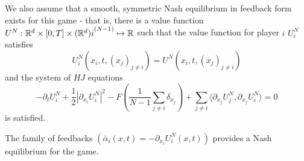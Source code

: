 We also assume that a smooth, symmetric Nash equilibrium in feedback form exists for
this game - that is, there is a value function
$U^N : \mathbb{R}^d \times [0,T] \times {(\mathbb{R}^d)i}^{(N-1)} \mapsto \mathbb{R}$ such that
the value function for player $i$ $U^N_i$ satisfies
\begin{equation}
    U^N_i(x_i, t, {(x_j)}_{j\neq i}) = U^N(x_i, t, {(x_j)}_{j\neq i})
\end{equation}
and the system of $HJ$ equations
\begin{equation}
    -\partial_t U_i^N + \frac{1}{2}|\partial_{x_i} U_i^N|^2 - F\left( \frac{1}{N-1}  \sum_{j\neq i} \delta_{x_j} \right) + \sum_{j \neq i} \langle \partial_{x_j} U^N_j, \partial_{x_j} U^N_i \rangle = 0
\end{equation}
is satisfied. 
\begin{proposition}
The family of feedbacks $({\bar\alpha}_i(x,t) = - \partial_{x_i} U^N_i (x,t))$
provides a Nash equilibrium for the game.
\end{proposition}
